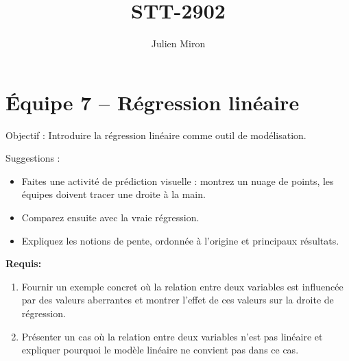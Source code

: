\documentclass{article}
\title{STT-2902}
\author{Julien Miron}
\begin{document}
\section*{Équipe 7 – Régression linéaire}

Objectif : Introduire la régression linéaire comme outil de modélisation.


\vspace{1cm}
Suggestions :
\begin{itemize}
    \item Faites une activité de prédiction visuelle : montrez un nuage de points, les équipes doivent tracer une droite à la main.
    \item Comparez ensuite avec la vraie régression.
    \item Expliquez les notions de pente, ordonnée à l'origine et principaux résultats.


\end{itemize}

\vspace{1cm}

\textbf{Requis:}

\begin{enumerate}
    \item Fournir un exemple concret où la relation entre deux variables est influencée par des valeurs aberrantes et montrer l’effet de ces valeurs sur la droite de régression.
    \item Présenter un cas où la relation entre deux variables n’est pas linéaire et expliquer pourquoi le modèle linéaire ne convient pas dans ce cas.
\end{enumerate}
\end{document}
